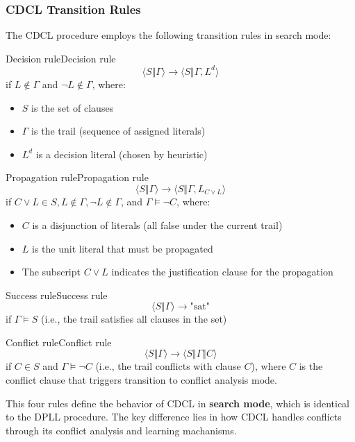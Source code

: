 \documentclass[a4paper]{article}
\theoremstyle{definition}
\begin{document}
\subsubsection{CDCL Transition Rules}
The CDCL procedure employs the following transition rules in search mode:
\begin{definition}{Decision rule}{Decision rule}
\[
  \langle S \Vert \varGamma \rangle \rightarrow \langle S \Vert \varGamma, L^d \rangle
\]
if \( L \notin \varGamma \) and \( \lnot L \notin \varGamma \), where:
\begin{itemize}
    \item \( S \) is the set of clauses 
    \item \( \varGamma \) is the trail (sequence of assigned literals)
    \item \( L^d \) is a decision literal (chosen by heuristic)
\end{itemize}
\end{definition}
\begin{definition}{Propagation rule}{Propagation rule}
\[
  \langle S \Vert \varGamma \rangle \rightarrow \langle S \Vert \varGamma, L_{C \vee L} \rangle 
\]
if \( C \vee L \in S, L \notin \varGamma, \lnot L \notin \varGamma \), and \( \varGamma \models \lnot C \), where:
\begin{itemize}
    \item \( C \) is a disjunction of literals (all false under the current trail)
    \item \( L \) is the unit literal that must be propagated 
    \item The subscript \( C \vee L \) indicates the justification clause for the propagation
\end{itemize}
\end{definition}
\begin{definition}{Success rule}{Success rule}
\[
  \langle S \Vert \varGamma \rangle \rightarrow \text{"sat"}
\]
if \( \varGamma \models S \) (i.e., the trail satisfies all clauses in the set)
\end{definition}
\begin{definition}{Conflict rule}{Conflict rule}
\[
  \langle S \Vert \varGamma \rangle \rightarrow \langle S \Vert \varGamma \Vert C \rangle 
\]  
if \( C \in S \) and \( \varGamma \models \lnot C \) (i.e., the trail conflicts with clause \( C \)), where
\( C \) is the conflict clause that triggers transition to conflict analysis mode.
\end{definition}
This four rules define the behavior of CDCL in \textbf{search mode}, which is identical to the DPLL
procedure. The key difference lies in how CDCL handles conflicts through its conflict analysis 
and learning machanisms.
\end{document}

